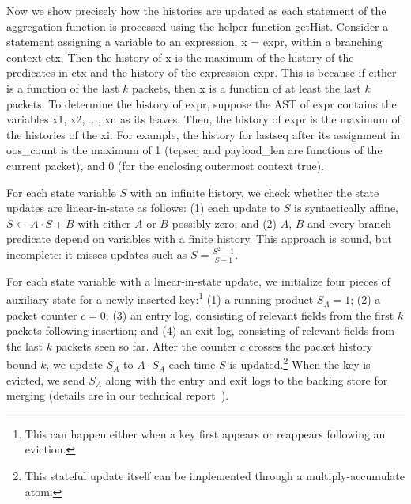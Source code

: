 Now we show precisely how the histories are updated as each statement of the
aggregation function is processed using the helper function {\sc getHist}.
Consider a statement assigning a variable to an expression, {\ct x = expr},
within a branching context {\ct ctx}. Then the history of {\ct x} is the
maximum of the history of the predicates in {\ct ctx} and the history of the
expression {\ct expr}. This is because if either is a function of the last $k$
packets, then {\ct x} is a function of at least the last $k$ packets.  To
determine the history of {\ct expr}, suppose the AST of {\ct expr} contains the
variables {\ct x1, x2, ..., xn} as its leaves. Then, the history of {\ct expr}
is the maximum of the histories of the {\ct xi}.  For example, the history for
{\ct lastseq} after its assignment in {\ct oos\_count} is the maximum of 1
({\ct tcpseq} and {\ct payload\_len} are functions of the current packet), and
0 (for the enclosing outermost context {\ct true}).

%

 For each
state variable $S$ with an infinite history, we check whether the state updates
are linear-in-state as follows: (1) each update to $S$ is syntactically affine,
\ie $S \gets A \cdot S + B$ with either $A$ or $B$ possibly zero; and (2) $A$,
$B$ and every branch predicate depend on variables with a finite history. This
approach is sound, but incomplete: it misses updates such as $S = \frac{S^2 -
1}{S - 1}$.

 For each state variable with a
linear-in-state update, we initialize four pieces of auxiliary state for a
newly inserted key:\footnote{This can happen either when a key first appears or
reappears following an eviction.} (1) a running product $S_A = 1$; (2) a packet
counter $c = 0$; (3) an entry log, consisting of relevant fields from the first
$k$ packets following insertion; and (4) an exit log, consisting of relevant
fields from the last $k$ packets seen so far.  After the counter $c$ crosses
the packet history bound $k$, we update $S_A$ to $A \cdot S_A$ each time $S$ is
updated.\footnote{This stateful update itself can be implemented through a
multiply-accumulate atom.} When the key is evicted, we send $S_A$ along with
the entry and exit logs to the backing store for merging (details are in our
technical report~\cite{theory-tr}).
